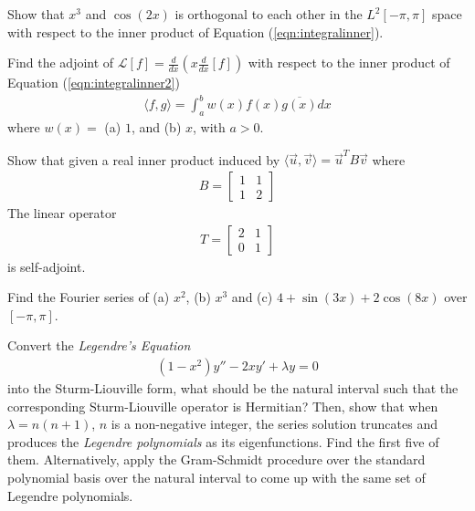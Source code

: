 \begin{Exercise}
Show that $x^3$ and $\cos(2x)$ is orthogonal to each other in the $L^2[-\pi, \pi]$ space with respect to the inner product of Equation (\ref{eqn:integralinner}).
\end{Exercise}

\begin{Exercise}
Find the adjoint of $\mathcal{L}[f] = \frac{d}{dx}(x\frac{d}{dx}[f])$ with respect to the inner product of Equation (\ref{eqn:integralinner2})
\begin{align*}
\langle f,g \rangle = \int_a^b w(x) f(x) \overline{g(x)} dx \label{eqn:integralinner2}   
\end{align*}
where $w(x) =$ (a) $1$, and (b) $x$, with $a > 0$.
\end{Exercise}

\begin{Exercise}
Show that given a real inner product induced by $\langle \vec{u},\vec{v} \rangle = \vec{u}^TB\vec{v}$ where
\begin{align*}
B = 
\begin{bmatrix}
1 & 1 \\
1 & 2
\end{bmatrix}
\end{align*}
The linear operator
\begin{align*}
T = 
\begin{bmatrix}
2 & 1 \\
0 & 1
\end{bmatrix}
\end{align*}
is self-adjoint.
\end{Exercise}

\begin{Exercise}
Find the Fourier series of (a) $x^2$, (b) $x^3$ and (c) $4+\sin(3x)+2\cos(8x)$ over $[-\pi, \pi]$.
\end{Exercise}

\begin{Exercise}
Convert the \textit{Legendre's Equation}
\begin{align*}
(1-x^2) y'' - 2xy' + \lambda y = 0
\end{align*}
into the Sturm-Liouville form, what should be the natural interval such that the corresponding Sturm-Liouville operator is Hermitian? Then, show that when $\lambda = n(n+1)$, $n$ is a non-negative integer, the series solution truncates and produces the \textit{Legendre polynomials} as its eigenfunctions. Find the first five of them. Alternatively, apply the Gram-Schmidt procedure over the standard polynomial basis over the natural interval to come up with the same set of Legendre polynomials.
\end{Exercise}